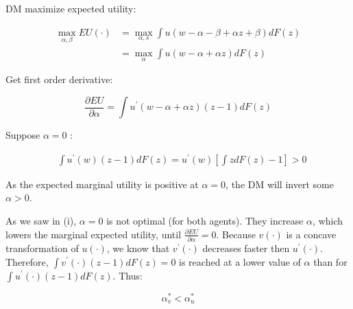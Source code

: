 {{\begin{enumerate}[label=(\roman*)]
{\item 
DM maximize expected utility:

$$
\begin{aligned}
\max _{\alpha, \beta} E U(\cdot) & =\max _{\alpha, s} \int u(w-\alpha-\beta+\alpha z+\beta) d F(z) \\
& =\max _{\alpha} \int u(w-\alpha+\alpha z) d F(z)
\end{aligned}
$$

Get first order derivative:

$$
\frac{\partial E U}{\partial \alpha}=\int u^{\prime}(w-\alpha+\alpha z)(z-1) d F(z)
$$

Suppose $\alpha=0$ :

$$
\begin{aligned}
& \int u^{\prime}(w)(z-1) d F(z)
= u^{\prime}(w)\left[\int z d F(z)-1\right]>0
\end{aligned}
$$

As the expected marginal utility is positive at $\alpha=0$, the DM will invert some $\alpha>0$.
}
{\item 
As we saw in (i), $\alpha=0$ is not optimal (for both agents). They increase $\alpha$, which lowers the marginal expected utility, until $\frac{\partial E U}{\partial \alpha}=0$.
Because $v(\cdot)$ is a concave transformation of $u(\cdot)$, we know that $v^{\prime}(\cdot)$ decreases faster then $u^{\prime}(\cdot)$.
Therefore, $\int v^{\prime}(\cdot)(z-1) d F(z)=0$ is reached at a lower value of $\alpha$ than for $\int u^{\prime}(\cdot)(z-1) d F(z)$. Thus:

$$
\alpha_{v}^{*}<\alpha_{u}^{*}
$$
}
\end{enumerate}
}
}

